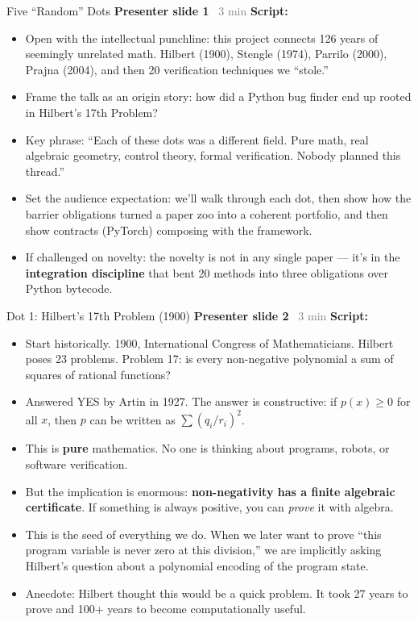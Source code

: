 \documentclass[aspectratio=169]{beamer}
\newcommand{\syncline}[2]{\textbf{#1} \hfill \textcolor{gray}{#2}}
\begin{document}
\begin{frame}{Five ``Random'' Dots}
\syncline{Presenter slide 1}{~3 min}
\textbf{Script:}
\begin{itemize}
  \item Open with the intellectual punchline: this project connects 126 years of seemingly unrelated math. Hilbert (1900), Stengle (1974), Parrilo (2000), Prajna (2004), and then 20 verification techniques we ``stole.''
  \item Frame the talk as an origin story: how did a Python bug finder end up rooted in Hilbert's 17th Problem?
  \item Key phrase: ``Each of these dots was a different field. Pure math, real algebraic geometry, control theory, formal verification. Nobody planned this thread.''
  \item Set the audience expectation: we'll walk through each dot, then show how the barrier obligations turned a paper zoo into a coherent portfolio, and then show contracts (PyTorch) composing with the framework.
  \item If challenged on novelty: the novelty is not in any single paper --- it's in the \textbf{integration discipline} that bent 20 methods into three obligations over Python bytecode.
\end{itemize}
\end{frame}


\begin{frame}{Dot 1: Hilbert's 17th Problem (1900)}
\syncline{Presenter slide 2}{~3 min}
\textbf{Script:}
\begin{itemize}
  \item Start historically. 1900, International Congress of Mathematicians. Hilbert poses 23 problems. Problem 17: is every non-negative polynomial a sum of squares of rational functions?
  \item Answered YES by Artin in 1927. The answer is constructive: if $p(x) \ge 0$ for all $x$, then $p$ can be written as $\sum (q_i/r_i)^2$.
  \item This is \textbf{pure} mathematics. No one is thinking about programs, robots, or software verification.
  \item But the implication is enormous: \textbf{non-negativity has a finite algebraic certificate}. If something is always positive, you can \emph{prove} it with algebra.
  \item This is the seed of everything we do. When we later want to prove ``this program variable is never zero at this division,'' we are implicitly asking Hilbert's question about a polynomial encoding of the program state.
  \item Anecdote: Hilbert thought this would be a quick problem. It took 27 years to prove and 100+ years to become computationally useful.
\end{itemize}
\end{frame}
\end{document}
